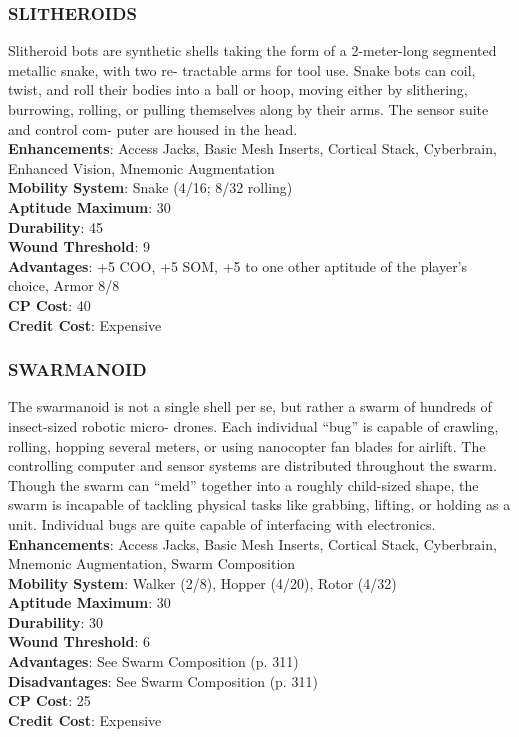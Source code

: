 \subsubsection{SLITHEROIDS}
Slitheroid bots are synthetic shells taking the form of
a 2-meter-long segmented metallic snake, with two re-
tractable arms for tool use. Snake bots can coil, twist,
and roll their bodies into a ball or hoop, moving either
by slithering, burrowing, rolling, or pulling themselves
along by their arms. The sensor suite and control com-
puter are housed in the head.
\\ \textbf{Enhancements}: Access Jacks, Basic Mesh Inserts,
Cortical Stack, Cyberbrain, Enhanced Vision, Mnemonic Augmentation
\\ \textbf{Mobility System}: Snake (4/16; 8/32 rolling)
\\ \textbf{Aptitude Maximum}: 30
\\ \textbf{Durability}: 45
\\ \textbf{Wound Threshold}: 9
\\ \textbf{Advantages}: +5 COO, +5 SOM, +5 to one other aptitude of the player’s choice, Armor 8/8
\\ \textbf{CP Cost}: 40
\\ \textbf{Credit Cost}: Expensive

\subsubsection{SWARMANOID}
The swarmanoid is not a single shell per se, but rather
a swarm of hundreds of insect-sized robotic micro-
drones. Each individual “bug” is capable of crawling,
rolling, hopping several meters, or using nanocopter
fan blades for airlift. The controlling computer and
sensor systems are distributed throughout the swarm.
Though the swarm can “meld” together into a roughly
child-sized shape, the swarm is incapable of tackling
physical tasks like grabbing, lifting, or holding as a
unit. Individual bugs are quite capable of interfacing
with electronics.
\\ \textbf{Enhancements}: Access Jacks, Basic Mesh Inserts, Cortical Stack, Cyberbrain, Mnemonic Augmentation,
Swarm Composition
\\ \textbf{Mobility System}: Walker (2/8), Hopper (4/20), Rotor
(4/32)
\\ \textbf{Aptitude Maximum}: 30
\\ \textbf{Durability}: 30
\\ \textbf{Wound Threshold}: 6
\\ \textbf{Advantages}: See Swarm Composition (p. 311)
\\ \textbf{Disadvantages}: See Swarm Composition (p. 311)
\\ \textbf{CP Cost}: 25
\\ \textbf{Credit Cost}: Expensive

